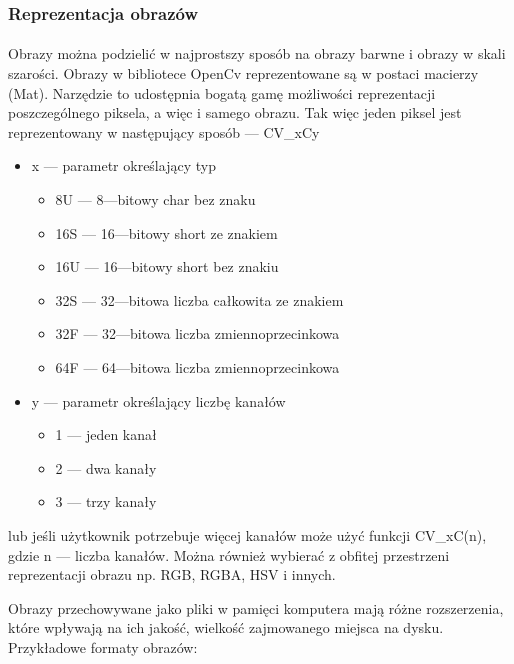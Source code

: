 \documentclass[a4paper,12pt]{article}
\begin{document}
    	\subsubsection{Reprezentacja obrazów}
			\paragraph{\indent} Obrazy można podzielić w najprostszy sposób na obrazy barwne i obrazy w skali szarości. Obrazy w bibliotece OpenCv 
				reprezentowane są w postaci macierzy (Mat). Narzędzie to udostępnia bogatą gamę możliwości reprezentacji poszczególnego piksela, 
				a więc i samego obrazu. Tak więc jeden piksel jest reprezentowany w następujący sposób --- CV\_xCy
			
				\begin{spacing}{1}
					\begin{itemize}
						\item{x --- parametr określający typ}
							\begin{itemize}
								\item{8U --- 8---bitowy char bez znaku}
								\item{16S --- 16---bitowy short ze znakiem}
								\item{16U --- 16---bitowy short bez znakiu}
								\item{32S --- 32---bitowa liczba całkowita ze znakiem}
								\item{32F --- 32---bitowa liczba zmiennoprzecinkowa}
								\item{64F --- 64---bitowa liczba zmiennoprzecinkowa}
							\end{itemize}
						\item{y  --- parametr określający liczbę kanałów}
							\begin{itemize}
								\item{1 --- jeden kanał}
								\item{2 --- dwa kanały}
								\item{3 --- trzy kanały}
							\end{itemize}
					\end{itemize}	
				\end{spacing}
			
				lub jeśli użytkownik potrzebuje więcej kanałów może użyć funkcji CV\_xC(n), gdzie n --- liczba kanałów. Można również wybierać 
				z obfitej przestrzeni reprezentacji obrazu np. RGB, RGBA, HSV i innych. 
			\par Obrazy przechowywane jako pliki w pamięci komputera mają różne rozszerzenia, które wpływają na ich jakość, 
				wielkość zajmowanego miejsca na dysku. Przykładowe formaty obrazów: 
			
\end{document}
